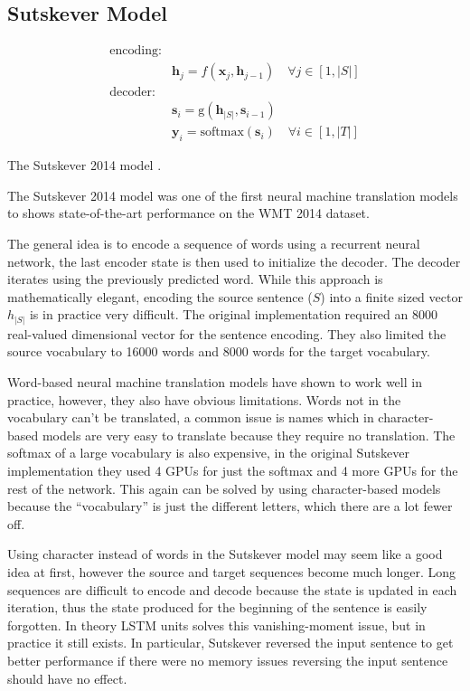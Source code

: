 \subsection{Sutskever Model}

\begin{equationbox}[H]
\begin{equation*}
\begin{aligned}
\text{encoding:} & \\
& \mathbf{h}_j = f(\mathbf{x}_j, \mathbf{h}_{j-1}) \quad \forall j \in [1, |S|] \\
\text{decoder:} & \\
&\mathbf{s}_i = \mathrm{g}(\mathbf{h}_{|S|}, \mathbf{s}_{i-1}) \\
&\mathbf{y}_i = \mathrm{softmax}(\mathbf{s}_i) \quad \forall i \in [1, |T|]
\end{aligned}
\end{equation*}
\caption{The Sutskever 2014 model \cite{sutskever-2014-nmt}.}
\end{equationbox}

The Sutskever 2014 model \cite{sutskever-2014-nmt} was one of the first neural machine translation models to shows state-of-the-art performance on the WMT 2014 dataset.

The general idea is to encode a sequence of words using a recurrent neural network, the last encoder state is then used to initialize the decoder. The decoder iterates using the previously predicted word. While this approach is mathematically elegant, encoding the source sentence ($S$) into a finite sized vector $h_{|S|}$ is in practice very difficult. The original implementation required an 8000 real-valued dimensional vector for the sentence encoding. They also limited the source vocabulary to 16000 words and 8000 words for the target vocabulary.

Word-based neural machine translation models have shown to work well in practice, however, they also have obvious limitations. Words not in the vocabulary can't be translated, a common issue is names which in character-based models are very easy to translate because they require no translation. The softmax of a large vocabulary is also expensive, in the original Sutskever implementation they used 4 GPUs for just the softmax and 4 more GPUs for the rest of the network. This again can be solved by using character-based models because the ``vocabulary'' is just the different letters, which there are a lot fewer off.

Using character instead of words in the Sutskever model may seem like a good idea at first, however the source and target sequences become much longer. Long sequences are difficult to encode and decode because the state is updated in each iteration, thus the state produced for the beginning of the sentence is easily forgotten. In theory LSTM units solves this vanishing-moment issue, but in practice it still exists. In particular, Sutskever reversed the input sentence to get better performance if there were no memory issues reversing the input sentence should have no effect.

